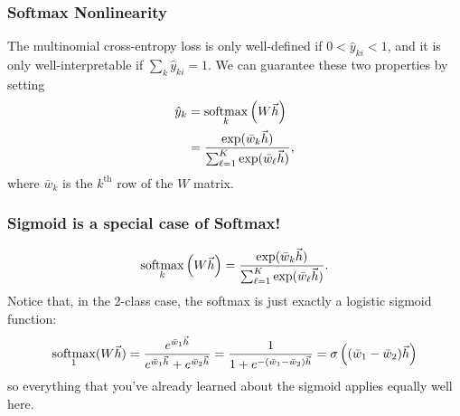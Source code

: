 \documentclass{beamer}
\newcommand{\softmax}{\operatornamewithlimits{softmax}}
\begin{document}
\begin{frame}
  \frametitle{Softmax Nonlinearity}

  The multinomial cross-entropy loss is only well-defined if
  $0<\hat{y}_{ki}<1$, and it is only well-interpretable if
  $\sum_k\hat{y}_{ki}=1$.  We can guarantee these two properties by
  setting
  \begin{align*}
    \hat{y}_k &= \softmax_k\left(W\vec{h}\right)\\
    &= \frac{\exp(\bar{w}_k\vec{h})}{\sum_{\ell=1}^K
      \exp(\bar{w}_\ell\vec{h})},
  \end{align*}
  where $\bar{w}_k$ is the $k^{\textrm{th}}$ row of the $W$ matrix.
\end{frame}

\begin{frame}
  \frametitle{Sigmoid is a special case of Softmax!}

  \begin{displaymath}
    \softmax_k\left(W\vec{h}\right)
    = \frac{\exp(\bar{w}_k\vec{h})}{\sum_{\ell=1}^K
      \exp(\bar{w}_\ell\vec{h})}.
  \end{displaymath}
  Notice that, in the 2-class case, the softmax is just exactly a
  logistic sigmoid function:
  \begin{displaymath}
    \softmax_1(W\vec{h}) = \frac{e^{\bar{w}_1\vec{h}}}{e^{\bar{w}_1\vec{h}}+e^{\bar{w}_2\vec{h}}}
    = \frac{1}{1+e^{-(\bar{w}_1-\bar{w}_2)\vec{h}}}  =\sigma\left((\bar{w}_1-\bar{w}_2)\vec{h}\right)
  \end{displaymath}
  so everything that you've already learned about the sigmoid applies
  equally well here.
\end{frame}
\end{document}
